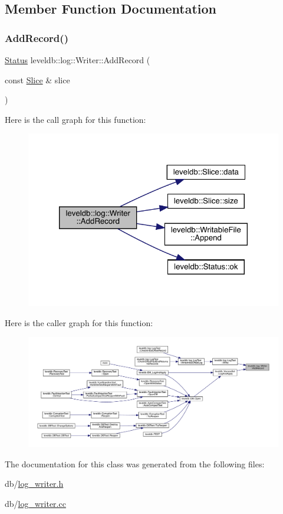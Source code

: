 \subsection{Member Function Documentation}
\mbox{\label{classleveldb_1_1log_1_1_writer_acb4abda5a5348ac1771657ff01bf2fad}} 
\subsubsection{\texorpdfstring{AddRecord()}{AddRecord()}}
{\footnotesize\ttfamily \mbox{\hyperlink{classleveldb_1_1_status}{Status}} leveldb\+::log\+::\+Writer\+::\+Add\+Record (\begin{DoxyParamCaption}\item[{const \mbox{\hyperlink{classleveldb_1_1_slice}{Slice}} \&}]{slice }\end{DoxyParamCaption})}

Here is the call graph for this function\+:
\nopagebreak
\begin{figure}[H]
\begin{center}
\leavevmode
\includegraphics[width=320pt]{classleveldb_1_1log_1_1_writer_acb4abda5a5348ac1771657ff01bf2fad_cgraph}
\end{center}
\end{figure}
Here is the caller graph for this function\+:
\nopagebreak
\begin{figure}[H]
\begin{center}
\leavevmode
\includegraphics[width=350pt]{classleveldb_1_1log_1_1_writer_acb4abda5a5348ac1771657ff01bf2fad_icgraph}
\end{center}
\end{figure}


The documentation for this class was generated from the following files\+:\begin{DoxyCompactItemize}
\item 
db/\mbox{\hyperlink{log__writer_8h}{log\+\_\+writer.\+h}}\item 
db/\mbox{\hyperlink{log__writer_8cc}{log\+\_\+writer.\+cc}}\end{DoxyCompactItemize}
